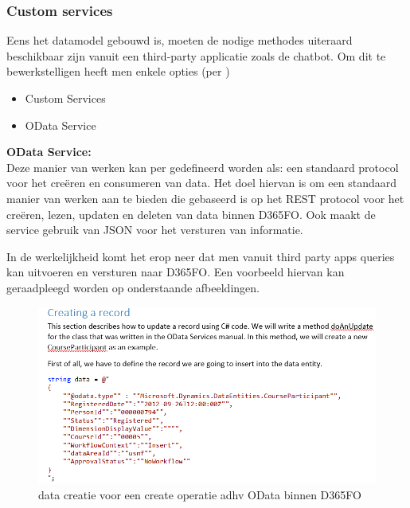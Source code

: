 \subsubsection{Custom services}
Eens het datamodel gebouwd is, moeten de nodige methodes uiteraard beschikbaar zijn vanuit een third-party applicatie zoals de chatbot. Om dit te bewerkstelligen heeft men enkele opties (per \textcite{Microsoft2019a})

\begin{itemize}
    \item Custom Services
    \item OData Service
\end{itemize}

\textbf{OData Service:}\\ 
Deze manier van werken kan per \textcite{Microsoft2019b} gedefineerd worden als: 
een standaard protocol voor het creëren en consumeren van data. Het doel hiervan is om een standaard manier van werken aan te bieden die gebaseerd is op het REST protocol voor het creëren, lezen, updaten en deleten van data binnen D365FO. Ook maakt de service gebruik van JSON voor het versturen van informatie. 

In de werkelijkheid komt het erop neer dat men vanuit third party apps queries kan uitvoeren en versturen naar D365FO. Een voorbeeld hiervan kan geraadpleegd worden op onderstaande afbeeldingen.

\begin{figure}[H]
    \centering
    \includegraphics[width=1\textwidth]{img/ODataExample}
    \caption{data creatie voor een create operatie adhv OData binnen D365FO \cite{Lanssens2018}}
    
\end{figure}

